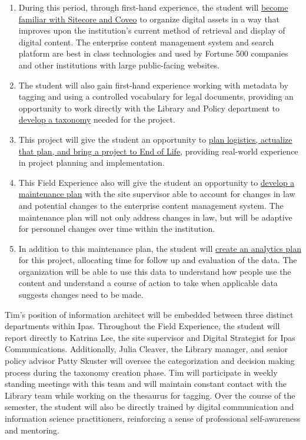 \documentclass{article}
\begin{document}
\begin{enumerate}
    \item During this period, through first-hand experience, the student will \ul{become familiar with Sitecore and Coveo} to organize digital assets in a way that improves upon the institution’s current method of retrieval and display of digital content. The enterprise content management system and search platform are best in class technologies and used by Fortune 500 companies and other institutions with large public-facing websites.
    \item The student will also gain first-hand experience working with metadata by tagging and using a controlled vocabulary for legal documents, providing an opportunity to work directly with the Library and Policy department to \ul{develop a taxonomy} needed for the project. 
    \item This project will give the student an opportunity to \ul{plan logistics, actualize that plan, and bring a project to End of Life}, providing real-world experience in project planning and implementation. 
    \item This Field Experience also will give the student an opportunity to \ul{develop a maintenance plan} with the site supervisor able to account for changes in law and potential changes to the enterprise content management system. The maintenance plan will not only address changes in law, but will be adaptive for personnel changes over time within the institution. 
    \item In addition to this maintenance plan, the student will \ul{create an analytics plan} for this project, allocating time for follow up and evaluation of the data. The organization will be able to use this data to understand how people use the content and understand a course of action to take when applicable data suggests changes need to be made.
\end{enumerate}
\smallskip

\noindent Tim's position of information architect will be embedded between three distinct departments within Ipas. Throughout the Field Experience, the student will report directly to Katrina Lee, the site supervisor and Digital Strategist for Ipas Communications. Additionally, Julia Cleaver, the Library manager, and senior policy advisor Patty Skuster will oversee the categorization and decision making process during the taxonomy creation phase. Tim will participate in weekly standing meetings with this team and will maintain constant contact with the Library team while working on the thesaurus for tagging. Over the course of the semester, the student will also be directly trained by digital communication and information science practitioners, reinforcing a sense of professional self-awareness and mentoring. 
\end{document}
